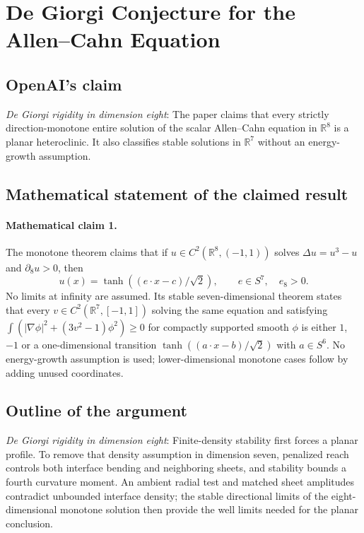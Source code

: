\documentclass[11pt]{article}
\begin{document}
\section*{De Giorgi Conjecture for the Allen–Cahn Equation}

\subsection{OpenAI's claim}
\textit{De Giorgi rigidity in dimension eight}: The paper claims that every strictly direction-monotone entire solution of the scalar Allen--Cahn equation in $\mathbb R^8$ is a planar heteroclinic. It also classifies stable solutions in $\mathbb R^7$ without an energy-growth assumption.

\subsection{Mathematical statement of the claimed result}
\paragraph{Mathematical claim 1.} The monotone theorem claims that if $u\in C^2(\mathbb R^8,(-1,1))$ solves $\Delta u=u^3-u$ and $\partial_8u>0$, then \[u(x)=\tanh((e\cdot x-c)/\sqrt2),\qquad e\in S^7,\quad e_8>0.\] No limits at infinity are assumed. Its stable seven-dimensional theorem states that every $v\in C^2(\mathbb R^7,[-1,1])$ solving the same equation and satisfying $\int(|\nabla\phi|^2+(3v^2-1)\phi^2)\ge0$ for compactly supported smooth $\phi$ is either $1$, $-1$ or a one-dimensional transition $\tanh((a\cdot x-b)/\sqrt2)$ with $a\in S^6$. No energy-growth assumption is used; lower-dimensional monotone cases follow by adding unused coordinates.

\subsection{Outline of the argument}
\textit{De Giorgi rigidity in dimension eight}: Finite-density stability first forces a planar profile. To remove that density assumption in dimension seven, penalized reach controls both interface bending and neighboring sheets, and stability bounds a fourth curvature moment. An ambient radial test and matched sheet amplitudes contradict unbounded interface density; the stable directional limits of the eight-dimensional monotone solution then provide the well limits needed for the planar conclusion.
\end{document}
